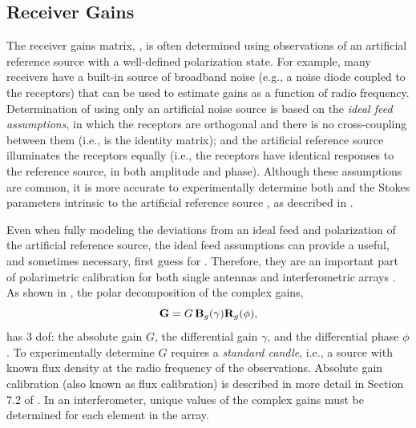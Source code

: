 
\subsection{ Receiver Gains }
\label{sec:calibration_gains}

The receiver gains matrix, , is often determined using observations of an artificial reference source with a well-defined polarization state.
%
For example, many receivers have a built-in source of broadband noise
(e.g.,  a noise diode coupled to the receptors) that can be used to estimate gains as a function of radio frequency.
%
Determination of  using only an artificial noise source is based on the \textit{ideal feed assumptions}, in which the receptors are orthogonal and there is no cross-coupling between them (i.e.,  is the identity matrix);
and the artificial reference source illuminates the receptors equally (i.e., the receptors have identical responses to the reference source, in both amplitude and phase).
%
Although these assumptions are common, it is more accurate to experimentally determine both  and the Stokes parameters intrinsic to the artificial reference source \citep[e.g.,][]{van04c}, as described in .

Even when fully modeling the deviations from an ideal feed and polarization of the artificial reference source, the ideal feed assumptions can provide a useful, and sometimes necessary, first guess for .
%
Therefore, they are an important part of polarimetric calibration for both single antennas \citep[e.g.,][]{hx97,nms+97,gl98,hdvl09} and interferometric arrays \citep[e.g.,][]{jkmg08,sjk+21}.
%
As shown in , the polar decomposition of the complex gains,
\begin{equation}
    {\bf G} = G \, {\bf B}_g(\gamma) {\bf R}_g(\phi),
\end{equation}
%
has 3 dof: the absolute gain $G$, the differential gain $\gamma$, and the differential phase $\phi$.
%
To experimentally determine $G$ requires a \textit{standard candle}, i.e., a source with known flux density at the radio frequency of the observations.
Absolute gain calibration (also known as flux calibration) is described in more detail in Section 7.2 of \cite{vdo12}.
%
In an interferometer, unique values of the complex gains must be determined for each element in the array.

